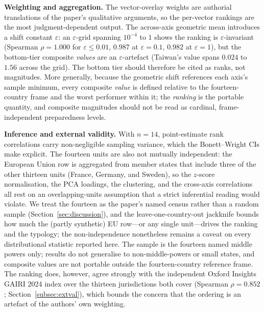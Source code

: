 \documentclass[11pt]{article}
\begin{document}
\textbf{Weighting and aggregation.} The vector-overlay weights are authorial translations of the paper's qualitative arguments, so the per-vector rankings are the most judgment-dependent output. The across-axis geometric mean introduces a shift constant $\varepsilon$: an $\varepsilon$-grid spanning $10^{-4}$ to $1$ shows the ranking is $\varepsilon$-invariant (Spearman $\rho=1.000$ for $\varepsilon\leq0.01$, $0.987$ at $\varepsilon=0.1$, $0.982$ at $\varepsilon=1$), but the bottom-tier composite \emph{values} are an $\varepsilon$-artefact (Taiwan's value spans $0.024$ to $1.56$ across the grid). The bottom tier should therefore be cited as ranks, not magnitudes. More generally, because the geometric shift references each axis's sample minimum, every composite \emph{value} is defined relative to the fourteen-country frame and the worst performer within it; the \emph{ranking} is the portable quantity, and composite magnitudes should not be read as cardinal, frame-independent preparedness levels.

\textbf{Inference and external validity.} With $n=14$, point-estimate rank correlations carry non-negligible sampling variance, which the Bonett--Wright CIs make explicit. The fourteen units are also not mutually independent: the European Union row is aggregated from member states that include three of the other thirteen units (France, Germany, and Sweden), so the $z$-score normalisation, the PCA loadings, the clustering, and the cross-axis correlations all rest on an overlapping-units assumption that a strict inferential reading would violate. We treat the fourteen as the paper's named census rather than a random sample (Section~\ref{sec:discussion}), and the leave-one-country-out jackknife bounds how much the (partly synthetic) EU row---or any single unit---drives the ranking and the typology; the non-independence nonetheless remains a caveat on every distributional statistic reported here. The sample is the fourteen named middle powers only; results do not generalise to non-middle-powers or small states, and composite values are not portable outside the fourteen-country reference frame. The ranking does, however, agree strongly with the independent Oxford Insights GAIRI 2024 index over the thirteen jurisdictions both cover (Spearman $\rho=0.852$; Section~\ref{subsec:extval}), which bounds the concern that the ordering is an artefact of the authors' own weighting.

\end{document}
